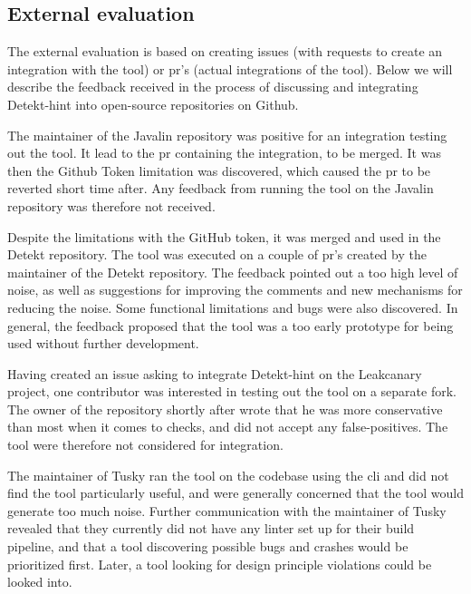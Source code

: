 \documentclass{report}
\begin{document}
\subsection{External evaluation}
\label{evaluation-open-source}
The external evaluation is based on creating issues (with requests to create an integration with the tool) or \gls{pr}'s (actual integrations of the tool). Below we will describe the feedback received in the process of discussing and integrating Detekt-hint into open-source repositories on Github. 

The maintainer of the Javalin repository was positive for an integration testing out the tool. It lead to the \gls{pr} containing the integration, to be merged. It was then the Github Token limitation was discovered, which caused the \gls{pr} to be reverted short time after. Any feedback from running the tool on the Javalin repository was therefore not received. 

Despite the limitations with the GitHub token, it was merged and used in the Detekt repository. The tool was executed on a couple of \gls{pr}'s created by the maintainer of the Detekt repository. The feedback pointed out a too high level of noise, as well as suggestions for improving the comments and new mechanisms for reducing the noise. Some functional limitations and bugs were also discovered. In general, the feedback proposed that the tool was a too early prototype for being used without further development.

Having created an issue asking to integrate Detekt-hint on the Leakcanary project, one contributor was interested in testing out the tool on a separate fork. The owner of the repository shortly after wrote that he was more conservative than most when it comes to checks, and did not accept any false-positives. The tool were therefore not considered for integration.

The maintainer of Tusky\cite{tusky} ran the tool on the codebase using the \gls{cli} and did not find the tool particularly useful, and were generally concerned that the tool would generate too much noise. Further communication with the maintainer of Tusky revealed that they currently did not have any linter set up for their build pipeline, and that a tool discovering possible bugs and crashes would be prioritized first. Later, a tool looking for design principle violations could be looked into.
\end{document}
